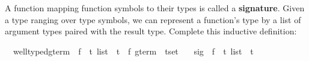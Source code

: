 \begin{isabellebody}
\begin{isamarkuptext}
\begin{exercise}
A function mapping function symbols to their 
types is called a \textbf{signature}.  Given a type 
ranging over type symbols, we can represent a function's type by a
list of argument types paired with the result type. 
Complete this inductive definition:
\begin{isabelle}
\isamarkupfalse%
\isanewline
\ \ well{}typed{}gterm\ {}{}\ {}{}{}f\ {}\ {}t\ list\ {}\ {}t{}\ {}\ {}{}f\ gterm\ {}\ {}t{}set{}\isanewline
\ \ \ sig\ {}{}\ {}{}f\ {}\ {}t\ list\ {}\ {}t{}%
\end{isabelle}
\end{exercise}
\end{isamarkuptext}
%
\isadelimproof
%
\endisadelimproof
%
\isatagproof
%
\endisatagproof
{\isafoldproof}%
%
\isadelimproof
%
\endisadelimproof
%
\isadelimproof
%
\endisadelimproof
%
\isatagproof
%
\endisatagproof
{\isafoldproof}%
%
\isadelimproof
%
\endisadelimproof
%
\isadelimtheory
%
\endisadelimtheory
%
\isatagtheory
%
\endisatagtheory
{\isafoldtheory}%
%
\isadelimtheory
%
\endisadelimtheory
\end{isabellebody}%
